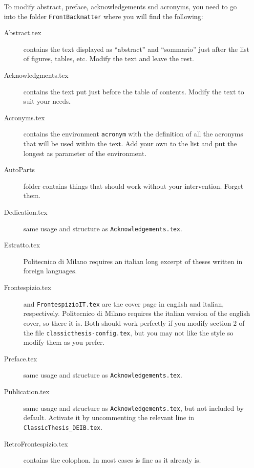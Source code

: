 To modify abstract, preface, acknowledgements snd acronyms, you need to go into the folder \verb!FrontBackmatter! where you will find the following:
\begin{description}

	\item[Abstract.tex] contains the text displayed as \enquote{abstract} and \enquote{sommario} just after the list of figures, tables, etc. Modify the text and leave the rest.

	\item[Acknowledgments.tex] contains the text put just before the table of contents. Modify the text to suit your needs.

	\item[Acronyms.tex] contains the environment \verb!acronym! with the definition of all the acronyms that will be used within the text. Add your own to the list and put the longest as parameter of the environment.
 
	\item[AutoParts] folder contains things that should work without your intervention. Forget them. 

	\item[Dedication.tex] same usage and structure as \verb!Acknowledgements.tex!.

	\item[Estratto.tex] Politecnico di Milano requires an italian long excerpt of theses written in foreign languages.

	\item[Frontespizio.tex] and \verb!FrontespizioIT.tex! are the cover page in english and italian, respectively. Politecnico di Milano requires the italian version of the english cover, so there it is. Both should work perfectly if you modify section 2 of the file \verb!classicthesis-config.tex!, but you may not like the style so modify them as you prefer.
	
	\item[Preface.tex] same usage and structure as \verb!Acknowledgements.tex!.

	\item[Publication.tex] same usage and structure as \verb!Acknowledgements.tex!, but not included by default. Activate it by uncommenting the relevant line in \verb!ClassicThesis_DEIB.tex!.

	\item[RetroFrontespizio.tex] contains the colophon. In most cases is fine as it already is.
\end{description}

